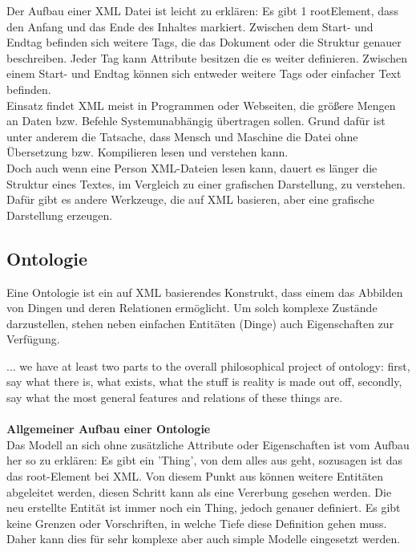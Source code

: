 Der Aufbau einer XML Datei ist leicht zu erklären: Es gibt 1 rootElement, dass den Anfang und das Ende des Inhaltes markiert. Zwischen dem Start- und Endtag befinden sich weitere Tags, die das Dokument oder die Struktur genauer beschreiben. Jeder Tag kann Attribute besitzen die es weiter definieren. Zwischen einem Start- und Endtag können sich entweder weitere Tags oder einfacher Text befinden.
\\
Einsatz findet XML meist in Programmen oder Webseiten, die größere Mengen an Daten bzw. Befehle Systemunabhängig übertragen sollen. Grund dafür ist unter anderem die Tatsache, dass Mensch und Maschine die Datei ohne Übersetzung bzw. Kompilieren lesen und verstehen kann.\\
Doch auch wenn eine Person XML-Dateien lesen kann, dauert es länger die Struktur eines Textes, im Vergleich zu einer grafischen Darstellung, zu verstehen.\\  
Dafür gibt es andere Werkzeuge, die auf XML basieren, aber eine grafische Darstellung erzeugen.
\subsection{Ontologie}
Eine Ontologie ist ein auf XML basierendes Konstrukt, dass einem das Abbilden von Dingen und deren Relationen ermöglicht. Um solch komplexe Zustände darzustellen, stehen neben einfachen Entitäten (Dinge) auch Eigenschaften zur Verfügung.

\glqq ... we have at least two parts to the overall philosophical project of ontology: first, say what there is, what exists, what the stuff is reality is made out off, secondly, say what the most general features and relations of these things are. \grqq \cite{ontology_stanford} \\
\\

\textbf{Allgemeiner Aufbau einer Ontologie}\\
Das Modell an sich ohne zusätzliche Attribute oder Eigenschaften ist vom Aufbau her so zu erklären: Es gibt ein 'Thing', von dem alles aus geht, sozusagen ist das das root-Element bei XML. Von diesem Punkt aus können weitere Entitäten abgeleitet werden, diesen Schritt kann als eine Vererbung gesehen werden. Die neu erstellte Entität ist immer noch ein Thing, jedoch genauer definiert. Es gibt keine Grenzen oder Vorschriften, in welche Tiefe diese Definition gehen muss. Daher kann dies für sehr komplexe aber auch simple Modelle eingesetzt werden.\\

